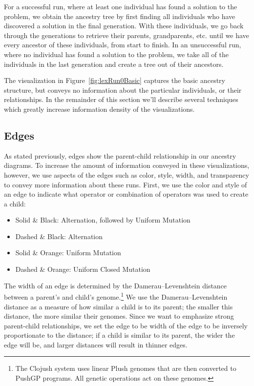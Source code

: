 \documentclass{sig-alternate}
\begin{document}
For a successful run, where at least one individual has found a solution to the problem, we 
obtain the ancestry tree by first finding all individuals who have discovered a solution in the 
final generation. With these individuals, we go back through the generations to retrieve 
their parents, grandparents, etc. until we have every ancestor of these individuals, from 
start to finish. In an unsuccessful run, where no individual has found a solution to the 
problem, we take all of the individuals in the last generation 
and create a tree out of their ancestors.

The visualization in Figure~\ref{fig:lexRun0Basic} captures the basic ancestry structure,
but conveys no information about the particular individuals, or their relationships. In
the remainder of this section we'll describe several techniques which greatly increase
information density of the visualizations.

\subsection{Edges}
\label{sec:edges}

As stated previously, edges show the parent-child relationship in our ancestry diagrams. 
To increase the amount of information conveyed in these visualizations, however, we
use aspects of the edges such as color, style, width, and transparency to convey
more information about these runs.  First, we use the color and style of an edge to 
indicate what operator or combination of operators was used to create a child:
\begin{itemize}
\setlength\itemsep{0em}
\item Solid \& Black: Alternation, followed by Uniform Mutation
\item Dashed \& Black: Alternation
\item Solid \& Orange: Uniform Mutation
\item Dashed \& Orange: Uniform Closed Mutation
\end{itemize}

The width of an edge is determined by the Damerau--Levenshtein 
distance~\cite{wiki:DLdist} between a parent's and child's genome.\footnote{The Clojush 
	system uses linear Plush genomes that are then converted to PushGP programs. All genetic operations act on these genomes.} 
We use the Damerau--Levenshtein distance as a measure of how similar a child is to its 
parent; the smaller this distance, the more similar their genomes. Since we want to
emphasize strong parent-child relationships, we set the edge to be width of the edge
to be inversely proportionate to the distance; if a child is similar to its parent, 
the wider the edge will be, and larger distances will result in thinner edges.
\end{document}
